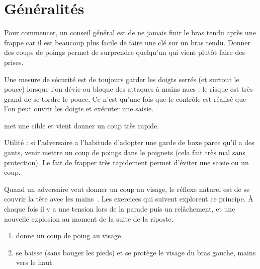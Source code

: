 \section{Généralités}


Pour commencer, un conseil général est de ne jamais finir le bras tendu après une frappe car il est beaucoup plus facile de faire une clé sur un bras tendu.
Donner des coups de poings permet de surprendre quelqu'un qui vient plutôt faire des prises.

Une mesure de sécurité est de toujours garder les doigts serrés (et surtout le pouce) lorsque l'on dévie ou bloque des attaques à mains nues : le risque est très grand de se tordre le pouce.
Ce n'est qu'une fois que le contrôle est réalisé que l'on peut ouvrir les doigts et exécuter une saisie.


\begin{exercice}


	\A met une cible et \D vient donner un coup très rapide.

	Utilité : si l'adversaire a l'habitude d'adopter une garde de boxe parce qu'il a des gants, venir mettre un coup de poings dans le poignets (cela fait très mal sans protection).
	Le fait de frapper très rapidement permet d'éviter une saisie ou un coup.

\end{exercice}


Quand un adversaire veut donner un coup au visage, le réflexe naturel est de se couvrir la tête avec les mains~\cite{enzi:dijon:messer_inner:2015}.
Les exercices qui suivent explorent ce principe.
À chaque fois il y a une tension lors de la parade puis un relâchement, et une nouvelle explosion au moment de la suite de la riposte.


\begin{exercice}
	\label{mains-nues:ex:enzi-1}

	\begin{enumerate}
		\item \A donne un coup de poing au visage.
		\item \D se baisse (sans bouger les pieds) et se protège le visage du bras gauche, mains vers le haut.
	\end{enumerate}

\end{exercice}


